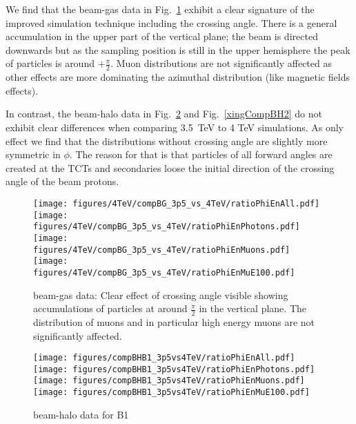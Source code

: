 We find that the beam-gas data in Fig.~\ref{xingCompBG} exhibit a clear signature of the improved simulation technique including the crossing angle. There is a general accumulation in the upper part of the vertical plane; the beam is directed downwards but as the sampling position is still in the upper hemisphere the peak of particles is around $+ \frac{\pi}{2}$. Muon distributions are not significantly affected as other effects are more dominating the azimuthal distribution (like magnetic fields effects). 

In contrast, the beam-halo data in Fig.~\ref{xingCompBH1} and Fig.~\ref{xingCompBH2} do not exhibit clear differences when comparing 3.5~TeV to 4 TeV simulations. As only effect we find that the distributions without crossing angle are slightly more symmetric in $\phi$. The reason for that is that particles of all forward angles are created at the TCTs and secondaries loose the initial direction of the crossing angle of the beam protons.

\begin{figure}
\begin{center}
  \texttt{[image: figures/4TeV/compBG\_3p5\_vs\_4TeV/ratioPhiEnAll.pdf]}
  \texttt{[image: figures/4TeV/compBG\_3p5\_vs\_4TeV/ratioPhiEnPhotons.pdf]}
  \texttt{[image: figures/4TeV/compBG\_3p5\_vs\_4TeV/ratioPhiEnMuons.pdf]}
  \texttt{[image: figures/4TeV/compBG\_3p5\_vs\_4TeV/ratioPhiEnMuE100.pdf]}
\end{center}
\vspace{-0.6cm}
 \caption{beam-gas data: Clear effect of crossing angle visible showing accumulations of particles at around $\frac{\pi}{2}$ in the vertical plane. The distribution of muons and in particular high energy muons are not significantly affected.
  \label{xingCompBG}}
\end{figure}

\begin{figure}
\begin{center}
  \texttt{[image: figures/compBHB1\_3p5vs4TeV/ratioPhiEnAll.pdf]}
  \texttt{[image: figures/compBHB1\_3p5vs4TeV/ratioPhiEnPhotons.pdf]}
  \texttt{[image: figures/compBHB1\_3p5vs4TeV/ratioPhiEnMuons.pdf]}
  \texttt{[image: figures/compBHB1\_3p5vs4TeV/ratioPhiEnMuE100.pdf]}
\end{center}
\vspace{-0.6cm}
 \caption{beam-halo data for B1
  \label{xingCompBH1}}
\end{figure}

